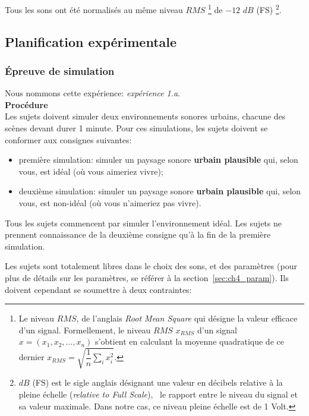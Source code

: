 Tous les sons ont été normalisés au même niveau $RMS$ \footnote{Le niveau $RMS$, de l'anglais \emph{Root Mean Square} qui désigne la valeur efficace d'un signal. Formellement, le niveau $RMS$ $x_{RMS}$ d'un signal $x=(x_1,x_2,\ldots,x_n)$ s'obtient en calculant la moyenne quadratique de ce dernier $x_{RMS}=\sqrt{\dfrac{1}{n}\sum\limits_{i} x_i^2}$.} de $-12$ $dB$ (FS) \footnote{$dB$ (FS) est le sigle anglais désignant une valeur en décibels relative à la pleine échelle (\emph{relative to Full Scale}), \ie~le rapport entre le niveau du signal et sa valeur maximale. Dans notre cas, ce niveau pleine échelle est de 1 Volt.}.

\subsection{Planification expérimentale}

\subsubsection{Épreuve de simulation}
\label{sec:ch5_planExpSimu}

Nous nommons cette expérience: \emph{expérience 1.a}. \\

{\setlength{\parindent}{0cm}\textbf{Procédure}} \\

Les sujets doivent simuler deux environnements sonores urbains, chacune des scènes devant durer 1 minute. Pour ces simulations, les sujets doivent se conformer aux consignes suivantes:

\begin{itemize}
\item première simulation: simuler un paysage sonore \textbf{urbain plausible} qui, selon vous, est idéal (où vous aimeriez vivre);
\item deuxième simulation: simuler un paysage sonore \textbf{urbain plausible} qui, selon vous, est non-idéal (où vous n'aimeriez pas vivre).
\end{itemize}

Tous les sujets commencent par simuler l'environnement idéal. Les sujets ne prennent connaissance de la deuxième consigne qu'à la fin de la première simulation.

Les sujets sont totalement libres dans le choix des sons, et des paramètres (pour plus de détails sur les paramètres, se référer à la section~\ref{sec:ch4_param}). Ils doivent cependant se soumettre à deux contraintes:

